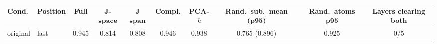 \begin{tabular}{llcccccccc}\toprule
Cond. & Position & Full & J-space & J span & Compl. & PCA-$k$ & Rand.\ sub.\ mean (p95) & Rand.\ atoms p95 & Layers clearing both\\\midrule
original & last & 0.945 & 0.814 & 0.808 & 0.946 & 0.938 & 0.765 (0.896) & 0.925 & 0/5\\
\midrule
\bottomrule\end{tabular}
